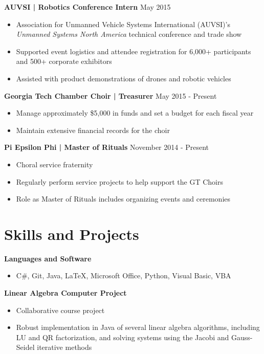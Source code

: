 \documentclass[11pt]{article}
\newcommand{\pipe}{| }
\begin{document}
\vspace{3pt}

\textbf{AUVSI \pipe Robotics Conference Intern} \hfill May 2015
\begin{itemize}
    \item Association for Unmanned Vehicle Systems International (AUVSI)'s \emph{Unmanned Systems North America} technical conference and trade show
    \item Supported event logistics and attendee registration for 6,000+ participants and 500+ corporate exhibitors
    \item Assisted with product demonstrations of drones and robotic vehicles
\end{itemize}

\vspace{3pt}

\textbf{Georgia Tech Chamber Choir \pipe Treasurer} \hfill May 2015 - Present
\begin{itemize}
    \item Manage approximately \$5,000 in funds and set a budget for each fiscal year
    \item Maintain extensive financial records for the choir
\end{itemize}

\vspace{3pt}

\textbf{Pi Epsilon Phi \pipe Master of Rituals} \hfill November 2014 - Present
\begin{itemize}
    \item Choral service fraternity
    \item Regularly perform service projects to help support the GT Choirs
    \item Role as Master of Rituals includes organizing events and ceremonies
\end{itemize}

\section*{Skills and Projects}
\textbf{Languages and Software}
\begin{itemize}
    \item C\#, Git, Java, \LaTeX, Microsoft Office, Python, Visual Basic, VBA
\end{itemize}

\vspace{3pt}

\textbf{Linear Algebra Computer Project}
\begin{itemize}
    \item Collaborative course project
    \item Robust implementation in Java of several linear algebra algorithms, including LU and QR factorization, and solving systems using the Jacobi and Gauss-Seidel iterative methods
\end{itemize}
\end{document}
